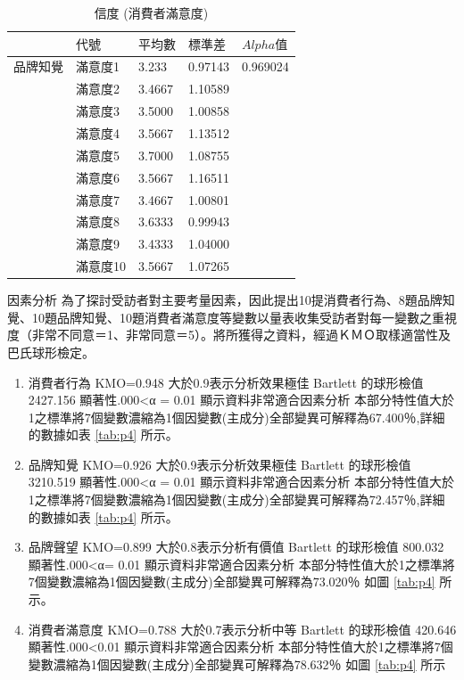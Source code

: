 \begin{table}[htb]
\caption{信度 (消費者滿意度)}
\label{tab:e4}
\renewcommand{\arraystretch}{1.2} %
\arrayrulewidth=1pt               %
\tabcolsep=6pt                   %
\begin{tabular}[t]{lllll}  %
\hline
 & $代號$& $平均數$ & $標準差$& $ Alpha 值 $ \\
\hline
品牌知覺 & 滿意度1&3.233&0.97143&0.969024\\
              & 滿意度2&3.4667&1.10589&  \\
             & 滿意度3&3.5000&1.00858&  \\
             & 滿意度4&3.5667&1.13512&\\
             & 滿意度5&3.7000&1.08755&  \\
             & 滿意度6&3.5667&1.16511&\\
             & 滿意度7&3.4667&1.00801&  \\
             & 滿意度8&3.6333&0.99943&  \\
             & 滿意度9&3.4333&1.04000&\\
             & 滿意度10&3.5667&1.07265&\\
\hline
\end{tabular}
\end{table}

因素分析
為了探討受訪者對主要考量因素，因此提出10提消費者行為、8題品牌知覺、10題品牌知覺、10題消費者滿意度等變數以量表收集受訪者對每一變數之重視度（非常不同意＝1、非常同意＝5）。將所獲得之資料，經過ＫＭＯ取樣適當性及巴氏球形檢定。
\begin{enumerate}
\item 消費者行為
KMO=0.948 大於0.9表示分析效果極佳 Bartlett 的球形檢值 2427.156 顯著性.000<α = 0.01 顯示資料非常適合因素分析  本部分特性值大於1之標準將7個變數濃縮為1個因變數(主成分)全部變異可解釋為67.400％,詳細的數據如表  \ref{tab:p4} 所示。
\item 品牌知覺
KMO=0.926 大於0.9表示分析效果極佳 Bartlett 的球形檢值 3210.519 顯著性.000<α = 0.01 顯示資料非常適合因素分析  本部分特性值大於1之標準將7個變數濃縮為1個因變數(主成分)全部變異可解釋為72.457％,詳細的數據如表  \ref{tab:p4} 所示。
\item 品牌聲望
KMO=0.899 大於0.8表示分析有價值 Bartlett 的球形檢值 800.032 顯著性.000<α= 0.01 顯示資料非常適合因素分析  本部分特性值大於1之標準將7個變數濃縮為1個因變數(主成分)全部變異可解釋為73.020％ 如圖 \ref{tab:p4}  所示。
\item 消費者滿意度
KMO=0.788 大於0.7表示分析中等 Bartlett 的球形檢值 420.646 顯著性.000<0.01 顯示資料非常適合因素分析  本部分特性值大於1之標準將7個變數濃縮為1個因變數(主成分)全部變異可解釋為78.632％ 如圖 \ref{tab:p4} 所示
\end{enumerate}

